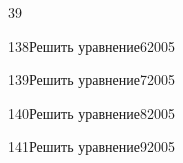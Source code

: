 \begin{TrigSourcePage}{39}
\begin{TrigExercise}{138}{Решить уравнение}{6}{2005}
\end{TrigExercise}
\begin{TrigExercise}{139}{Решить уравнение}{7}{2005}
\end{TrigExercise}
\begin{TrigExercise}{140}{Решить уравнение}{8}{2005}
\end{TrigExercise}
\begin{TrigExercise}{141}{Решить уравнение}{9}{2005}
\end{TrigExercise}
\end{TrigSourcePage}

